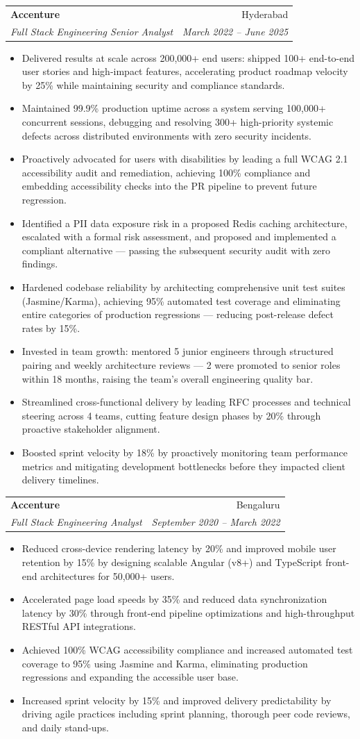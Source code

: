 \documentclass[letterpaper,11pt]{article}
\makeatletter
\newcommand{\resumeItem}[1]{\item\small{{#1 \vspace{-2pt}}}}
\newcommand{\resumeSubheading}[4]{
  \vspace{-2pt}\item
    \begin{tabular*}{0.97\textwidth}[t]{l@{\extracolsep{\fill}}r}
      \textbf{#1} & #2 \\
      \textit{\small#3} & \textit{\small #4} \\
    \end{tabular*}\vspace{-7pt}
}
\newcommand{\resumeItemListStart}{\begin{itemize}}
\newcommand{\resumeItemListEnd}{\end{itemize}\vspace{-5pt}}
\makeatother
\begin{document}
    \resumeSubheading
      {Accenture}{Hyderabad}
      {Full Stack Engineering Senior Analyst}{March 2022 -- June 2025}
      \resumeItemListStart
        \resumeItem{Delivered results at scale across 200,000+ end users: shipped 100+ end-to-end user stories and high-impact features, accelerating product roadmap velocity by 25\% while maintaining security and compliance standards.}
        \resumeItem{Maintained 99.9\% production uptime across a system serving 100,000+ concurrent sessions, debugging and resolving 300+ high-priority systemic defects across distributed environments with zero security incidents.}
        \resumeItem{Proactively advocated for users with disabilities by leading a full WCAG 2.1 accessibility audit and remediation, achieving 100\% compliance and embedding accessibility checks into the PR pipeline to prevent future regression.}
        \resumeItem{Identified a PII data exposure risk in a proposed Redis caching architecture, escalated with a formal risk assessment, and proposed and implemented a compliant alternative --- passing the subsequent security audit with zero findings.}
        \resumeItem{Hardened codebase reliability by architecting comprehensive unit test suites (Jasmine/Karma), achieving 95\% automated test coverage and eliminating entire categories of production regressions --- reducing post-release defect rates by 15\%.}
        \resumeItem{Invested in team growth: mentored 5 junior engineers through structured pairing and weekly architecture reviews --- 2 were promoted to senior roles within 18 months, raising the team's overall engineering quality bar.}
        \resumeItem{Streamlined cross-functional delivery by leading RFC processes and technical steering across 4 teams, cutting feature design phases by 20\% through proactive stakeholder alignment.}
        \resumeItem{Boosted sprint velocity by 18\% by proactively monitoring team performance metrics and mitigating development bottlenecks before they impacted client delivery timelines.}
      \resumeItemListEnd

    \resumeSubheading
      {Accenture}{Bengaluru}
      {Full Stack Engineering Analyst}{September 2020 -- March 2022}
      \resumeItemListStart
        \resumeItem{Reduced cross-device rendering latency by 20\% and improved mobile user retention by 15\% by designing scalable Angular (v8+) and TypeScript front-end architectures for 50,000+ users.}
        \resumeItem{Accelerated page load speeds by 35\% and reduced data synchronization latency by 30\% through front-end pipeline optimizations and high-throughput RESTful API integrations.}
        \resumeItem{Achieved 100\% WCAG accessibility compliance and increased automated test coverage to 95\% using Jasmine and Karma, eliminating production regressions and expanding the accessible user base.}
        \resumeItem{Increased sprint velocity by 15\% and improved delivery predictability by driving agile practices including sprint planning, thorough peer code reviews, and daily stand-ups.}
      \resumeItemListEnd
\end{document}
